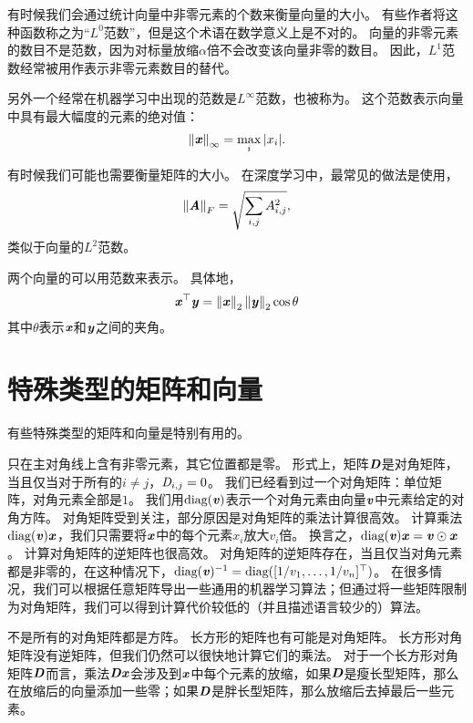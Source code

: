 有时候我们会通过统计向量中非零元素的个数来衡量向量的大小。
有些作者将这种函数称之为“$L^0$范数”，但是这个术语在数学意义上是不对的。
向量的非零元素的数目不是范数，因为对标量放缩$\alpha$倍不会改变该向量非零的数目。
因此，$L^1$范数经常被用作表示非零元素数目的替代。





另外一个经常在机器学习中出现的范数是$L^\infty$范数，也被称为。
这个范数表示向量中具有最大幅度的元素的绝对值：
\begin{equation}
    \left\lVert\boldsymbol{\mathit{x}}\right\rVert_\infty = \max_i |x_i|.
\end{equation}


有时候我们可能也需要衡量矩阵的大小。
在深度学习中，最常见的做法是使用，
\begin{equation}
    \left\lVert\boldsymbol{\mathit{A}}\right\rVert_F = \sqrt{\sum_{i,j} A_{i,j}^2}, 
\end{equation}
类似于向量的$L^2$范数。


两个向量的可以用范数来表示。
具体地，
\begin{equation}
    \boldsymbol{\mathit{x}}^\top\boldsymbol{\mathit{y}} = \left\lVert\boldsymbol{\mathit{x}}\right\rVert_2\left\lVert\boldsymbol{\mathit{y}}\right\rVert_2 \cos \theta
\end{equation}
其中$\theta$表示$\boldsymbol{\mathit{x}}$和$\boldsymbol{\mathit{y}}$之间的夹角。




\section{特殊类型的矩阵和向量}
\label{sec:special_kinds_of_matrices_and_vectors}

有些特殊类型的矩阵和向量是特别有用的。


只在主对角线上含有非零元素，其它位置都是零。
形式上，矩阵$\boldsymbol{\mathit{D}}$是对角矩阵，当且仅当对于所有的$i\neq j$，$\mathit{D}_{i,j}=0$。
我们已经看到过一个对角矩阵：单位矩阵，对角元素全部是$1$。
我们用$\text{diag}(\boldsymbol{\mathit{v}})$表示一个对角元素由向量$\boldsymbol{\mathit{v}}$中元素给定的对角方阵。
对角矩阵受到关注，部分原因是对角矩阵的乘法计算很高效。
计算乘法$\text{diag}(\boldsymbol{\mathit{v}})\boldsymbol{\mathit{x}}$，我们只需要将$\boldsymbol{\mathit{x}}$中的每个元素$x_i$放大$v_i$倍。
换言之，$\text{diag}(\boldsymbol{\mathit{v}})\boldsymbol{\mathit{x}}=\boldsymbol{\mathit{v}} \odot \boldsymbol{\mathit{x}}$。
计算对角矩阵的逆矩阵也很高效。
对角矩阵的逆矩阵存在，当且仅当对角元素都是非零的，在这种情况下，$\text{diag}(\boldsymbol{\mathit{v}})^{-1}=\text{diag}([1/v_1,\dots,1/v_n]^\top)$。
在很多情况，我们可以根据任意矩阵导出一些通用的机器学习算法；但通过将一些矩阵限制为对角矩阵，我们可以得到计算代价较低的（并且描述语言较少的）算法。


不是所有的对角矩阵都是方阵。
长方形的矩阵也有可能是对角矩阵。
长方形对角矩阵没有逆矩阵，但我们仍然可以很快地计算它们的乘法。
对于一个长方形对角矩阵$\boldsymbol{\mathit{D}}$而言，乘法$\boldsymbol{\mathit{D}}\boldsymbol{\mathit{x}}$会涉及到$\boldsymbol{\mathit{x}}$中每个元素的放缩，如果$\boldsymbol{\mathit{D}}$是瘦长型矩阵，那么在放缩后的向量添加一些零；如果$\boldsymbol{\mathit{D}}$是胖长型矩阵，那么放缩后去掉最后一些元素。


